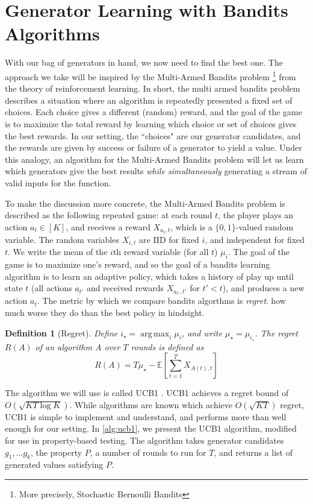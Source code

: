 \documentclass[sigconf,nonacm]{acmart}
\newtheorem{definition}{Definition}
\DeclareMathOperator*{\argmax}{arg\,max}
\begin{document}
\section{Generator Learning with Bandits Algorithms}
\label{sec:bandits}
With our bag of generators in hand, we now need to find the best one. The approach we take will be inspired by the Multi-Armed Bandits \cite{gittins1979bandit} problem \footnote{More precisely, Stochastic Bernoulli Bandits} from the theory of reinforcement learning. In short, the multi armed bandits problem describes a situation where an algorithm is repeatedly presented a fixed set of choices. Each choice gives a different (random) reward, and the goal of the game is to maximize the total reward by learning which choice or set of choices gives the best rewards. In our setting, the ``choices" are our generator candidates, and the rewards are given by success or failure of a generator to yield a value. Under this analogy, an algorithm for the Multi-Armed Bandits problem will let us learn which generators give the best results \textit{while simultaneously} generating a stream of valid inputs for the function.

To make the discussion more concrete, the Multi-Armed Bandits problem is described as the following repeated game: at each round $t$, the player plays an action $a_t \in [K]$, and receives a reward $X_{{a_t},t}$, which is a $\{0,1\}$-valued random variable. The random variables $X_{i,t}$ are IID for fixed $i$, and independent for fixed $t$. We write the mean of the $i$th reward variable (for all $t$) $\mu_i$. The goal of the game is to maximize one's reward, and so the goal of a bandits learning algorithm is to learn an adaptive policy, which takes a history of play up until state $t$ (all actions $a_{t'}$ and received rewards $X_{a_{t'},t'}$ for $t' < t$), and produces a new action $a_t$. The metric by which we compare bandits algorthms is \textit{regret}: how much worse they do than the best policy in hindsight.

\begin{definition}[Regret]
Define $i_\star = \argmax_i \mu_i$, and write $\mu_\star = \mu_{i_\star}$. The regret $R(A)$ of an algorithm $A$ over $T$ rounds is defined as
$$
R(A) = T\mu_\star - \mathbb{E}\left[\sum_{t=1}^T X_{A(t),t}\right]
$$
\end{definition}

The algorithm we will use is called UCB1 \cite{auer2002finite}. UCB1 achieves a regret bound of $O(\sqrt{KT\log K})$. While algorithms are known which achieve $O(\sqrt{KT})$ regret, UCB1 is simple to implement and understand, and performs more than well enough for our setting. In \autoref{alg:ucb1}, we present the UCB1 algorithm, modified for use in property-based testing. The algorithm takes generator candidates $g_1,\dots g_k$, the property $P$, a number of rounds to run for $T$, and returns a list of generated values satisfying $P$.
\end{document}
